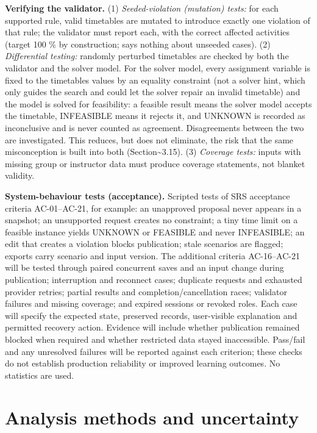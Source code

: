 \documentclass[
  11pt,a4paper,oneside]{report}
\begin{document}
\textbf{Verifying the validator.} (1) \emph{Seeded-violation (mutation)
tests:} for each supported rule, valid timetables are mutated to
introduce exactly one violation of that rule; the validator must report
each, with the correct affected activities (target 100 \% by
construction; says nothing about unseeded cases). (2) \emph{Differential
testing:} randomly perturbed timetables are checked by both the
validator and the solver model. For the solver model, every assignment
variable is fixed to the timetable\textquotesingle s values by an
equality constraint (not a solver hint, which only guides the search and
could let the solver repair an invalid timetable) and the model is
solved for feasibility: a feasible result means the solver model accepts
the timetable, INFEASIBLE means it rejects it, and UNKNOWN is recorded
as inconclusive and is never counted as agreement. Disagreements between
the two are investigated. This reduces, but does not eliminate, the risk
that the same misconception is built into both
(Section\textasciitilde3.15). (3) \emph{Coverage tests:} inputs with
missing group or instructor data must produce coverage statements, not
blanket validity.

\textbf{System-behaviour tests (acceptance).} Scripted tests of SRS
acceptance criteria AC-01--AC-21, for example: an unapproved proposal
never appears in a snapshot; an unsupported request creates no
constraint; a tiny time limit on a feasible instance yields UNKNOWN or
FEASIBLE and never INFEASIBLE; an edit that creates a violation blocks
publication; stale scenarios are flagged; exports carry scenario and
input version. The additional criteria AC-16--AC-21 will be tested through paired concurrent saves and an input change during publication; interruption and reconnect cases; duplicate requests and exhausted provider retries; partial results and completion/cancellation races; validator failures and missing coverage; and expired sessions or revoked roles. Each case will specify the expected state, preserved records, user-visible explanation and permitted recovery action. Evidence will include whether publication remained blocked when required and whether restricted data stayed inaccessible. Pass/fail and any unresolved failures will be reported against each criterion; these checks do not establish production reliability or improved learning outcomes. No statistics are used.

\hypertarget{analysis-methods-and-uncertainty}{%
\section{Analysis methods and
uncertainty}\label{analysis-methods-and-uncertainty}}
\end{document}
